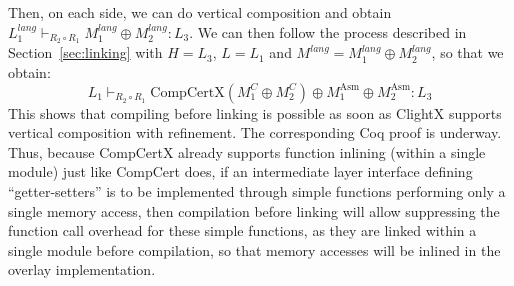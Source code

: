 Then, on each side, we can do vertical composition and obtain
$L_1^{\mathit{lang}} \vdash_{R_2 \circ R_1} M_1^{\mathit{lang}} \oplus
M_2^{\mathit{lang}} : L_3$. We can then follow the process described
in Section~\ref{sec:linking} with $H = L_3$, $L = L_1$ and
$M^{\mathit{lang}} = M_1^{\mathit{lang}} \oplus M_2^{\mathit{lang}}$, so that we obtain:
\[
L_1 \vdash_{R_2 \circ R_1} \mathrm{CompCertX}(M_1^C \oplus M_2^C) \oplus M_1^{\mathrm{Asm}} \oplus M_2^{\mathrm{Asm}}: L_3
\]
This shows that compiling before linking is possible as soon as
ClightX supports vertical composition with refinement. The
corresponding Coq proof is underway. Thus, because CompCertX already
supports function inlining (within a single module) just like CompCert
does, if an intermediate layer interface defining ``getter-setters'' is to be
implemented through simple functions performing only a single memory
access, then compilation before linking will allow suppressing the
function call overhead for these simple functions, as they are linked
within a single module before compilation, so that memory accesses
will be inlined in the overlay implementation.


